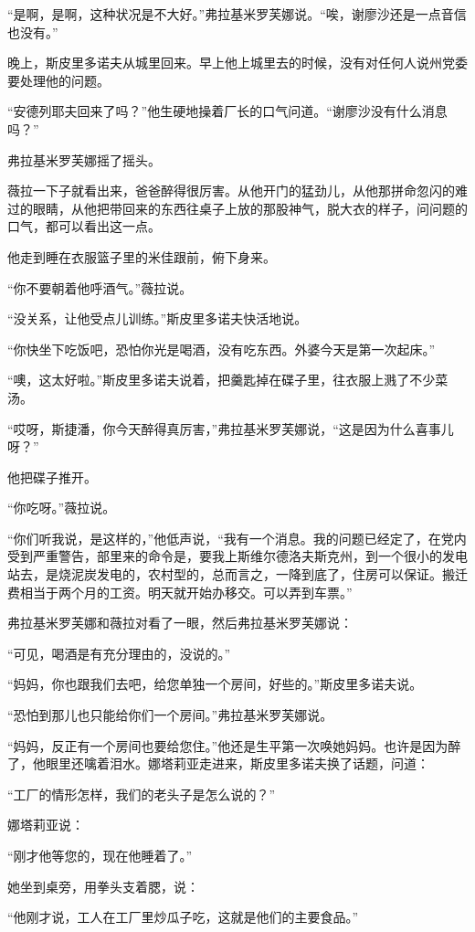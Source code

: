 “是啊，是啊，这种状况是不大好。”弗拉基米罗芙娜说。“唉，谢廖沙还是一点音信也没有。”

晚上，斯皮里多诺夫从城里回来。早上他上城里去的时候，没有对任何人说州党委要处理他的问题。

“安德列耶夫回来了吗？”他生硬地操着厂长的口气问道。“谢廖沙没有什么消息吗？”

弗拉基米罗芙娜摇了摇头。

薇拉一下子就看出来，爸爸醉得很厉害。从他开门的猛劲儿，从他那拼命忽闪的难过的眼睛，从他把带回来的东西往桌子上放的那股神气，脱大衣的样子，问问题的口气，都可以看出这一点。

他走到睡在衣服篮子里的米佳跟前，俯下身来。

“你不要朝着他呼酒气。”薇拉说。

“没关系，让他受点儿训练。”斯皮里多诺夫快活地说。

“你快坐下吃饭吧，恐怕你光是喝酒，没有吃东西。外婆今天是第一次起床。”

“噢，这太好啦。”斯皮里多诺夫说着，把羹匙掉在碟子里，往衣服上溅了不少菜汤。

“哎呀，斯捷潘，你今天醉得真厉害，”弗拉基米罗芙娜说，“这是因为什么喜事儿呀？”

他把碟子推开。

“你吃呀。”薇拉说。

“你们听我说，是这样的，”他低声说，“我有一个消息。我的问题已经定了，在党内受到严重警告，部里来的命令是，要我上斯维尔德洛夫斯克州，到一个很小的发电站去，是烧泥炭发电的，农村型的，总而言之，一降到底了，住房可以保证。搬迁费相当于两个月的工资。明天就开始办移交。可以弄到车票。”

弗拉基米罗芙娜和薇拉对看了一眼，然后弗拉基米罗芙娜说：

“可见，喝酒是有充分理由的，没说的。”

“妈妈，你也跟我们去吧，给您单独一个房间，好些的。”斯皮里多诺夫说。

“恐怕到那儿也只能给你们一个房间。”弗拉基米罗芙娜说。

“妈妈，反正有一个房间也要给您住。”他还是生平第一次唤她妈妈。也许是因为醉了，他眼里还噙着泪水。娜塔莉亚走进来，斯皮里多诺夫换了话题，问道：

“工厂的情形怎样，我们的老头子是怎么说的？”

娜塔莉亚说：

“刚才他等您的，现在他睡着了。”

她坐到桌旁，用拳头支着腮，说：

“他刚才说，工人在工厂里炒瓜子吃，这就是他们的主要食品。”

